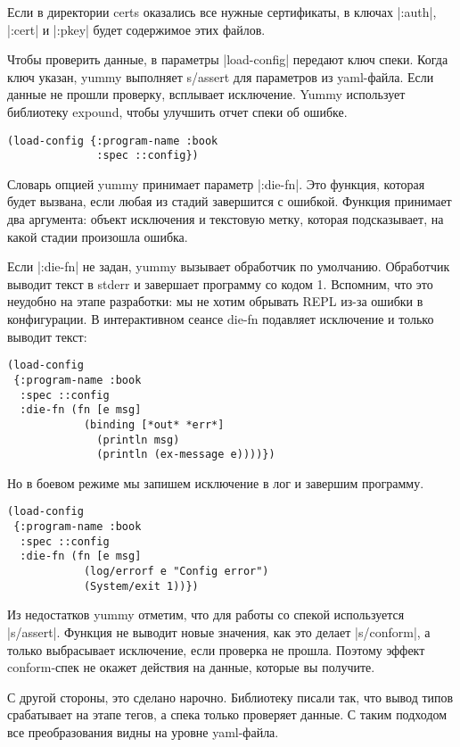 Если в директории certs оказались все нужные сертификаты, в ключах \spverb|:auth|,
\spverb|:cert| и \spverb|:pkey| будет содержимое этих файлов.

Чтобы проверить данные, в параметры \spverb|load-config| передают ключ спеки. Когда
ключ указан, yummy выполняет s/assert для параметров из yaml-файла. Если данные
не прошли проверку, всплывает исключение. Yummy использует библиотеку expound,
чтобы улучшить отчет спеки об ошибке.

\begin{verbatim}
(load-config {:program-name :book
              :spec ::config})
\end{verbatim}

Словарь опцией yummy принимает параметр \spverb|:die-fn|. Это функция, которая будет
вызвана, если любая из стадий завершится с ошибкой. Функция принимает два
аргумента: объект исключения и текстовую метку, которая подсказывает, на какой
стадии произошла ошибка.

Если \spverb|:die-fn| не задан, yummy вызывает обработчик по умолчанию. Обработчик
выводит текст в stderr и завершает программу со кодом 1. Вспомним, что это
неудобно на этапе разработки: мы не хотим обрывать REPL из-за ошибки в
конфигурации. В интерактивном сеансе die-fn подавляет исключение и только
выводит текст:

\begin{verbatim}
(load-config
 {:program-name :book
  :spec ::config
  :die-fn (fn [e msg]
            (binding [*out* *err*]
              (println msg)
              (println (ex-message e))))})
\end{verbatim}

Но в боевом режиме мы запишем исключение в лог и завершим программу.

\begin{verbatim}
(load-config
 {:program-name :book
  :spec ::config
  :die-fn (fn [e msg]
            (log/errorf e "Config error")
            (System/exit 1))})
\end{verbatim}

Из недостатков yummy отметим, что для работы со спекой используется
\spverb|s/assert|. Функция не выводит новые значения, как это делает
\spverb|s/conform|, а только выбрасывает исключение, если проверка не
прошла. Поэтому эффект conform-спек не окажет действия на данные, которые вы
получите.

С другой стороны, это сделано нарочно. Библиотеку писали так, что вывод типов
срабатывает на этапе тегов, а спека только проверяет данные. С таким подходом
все преобразования видны на уровне yaml-файла.

